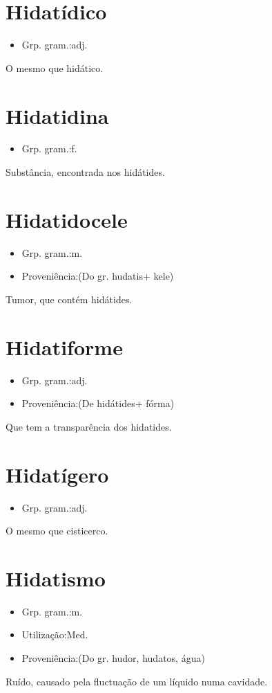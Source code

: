 \documentclass{article}
\begin{document}
\section{Hidatídico}
\begin{itemize}
\item {Grp. gram.:adj.}
\end{itemize}
O mesmo que \textunderscore hidático\textunderscore .
\section{Hidatidina}
\begin{itemize}
\item {Grp. gram.:f.}
\end{itemize}
Substância, encontrada nos hidátides.
\section{Hidatidocele}
\begin{itemize}
\item {Grp. gram.:m.}
\end{itemize}
\begin{itemize}
\item {Proveniência:(Do gr. \textunderscore hudatis\textunderscore  + \textunderscore kele\textunderscore )}
\end{itemize}
Tumor, que contém hidátides.
\section{Hidatiforme}
\begin{itemize}
\item {Grp. gram.:adj.}
\end{itemize}
\begin{itemize}
\item {Proveniência:(De \textunderscore hidátides\textunderscore  + \textunderscore fórma\textunderscore )}
\end{itemize}
Que tem a transparência dos hidatides.
\section{Hidatígero}
\begin{itemize}
\item {Grp. gram.:adj.}
\end{itemize}
O mesmo que \textunderscore cisticerco\textunderscore .
\section{Hidatismo}
\begin{itemize}
\item {Grp. gram.:m.}
\end{itemize}
\begin{itemize}
\item {Utilização:Med.}
\end{itemize}
\begin{itemize}
\item {Proveniência:(Do gr. \textunderscore hudor\textunderscore , \textunderscore hudatos\textunderscore , água)}
\end{itemize}
Ruído, causado pela fluctuação de um líquido numa cavidade.
\end{document}
